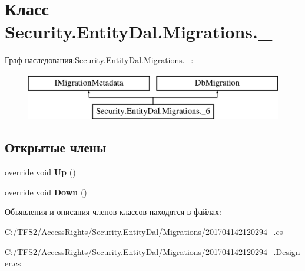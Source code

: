 \hypertarget{class_security_1_1_entity_dal_1_1_migrations_1_1__6}{}\section{Класс Security.\+Entity\+Dal.\+Migrations.\+\_}
\label{class_security_1_1_entity_dal_1_1_migrations_1_1__6}
Граф наследования\+:Security.\+Entity\+Dal.\+Migrations.\+\_\+:\begin{figure}[H]
\begin{center}
\leavevmode
\includegraphics[height=2.000000cm]{d0/d06/class_security_1_1_entity_dal_1_1_migrations_1_1__6}
\end{center}
\end{figure}
\subsection*{Открытые члены}
\begin{DoxyCompactItemize}
\item 
\mbox{\label{class_security_1_1_entity_dal_1_1_migrations_1_1__6_a51a2900e9ab59eee81830477fda90f90}} 
override void {\bfseries Up} ()
\item 
\mbox{\label{class_security_1_1_entity_dal_1_1_migrations_1_1__6_a2881353eafa9f28a52a3866fda3612fb}} 
override void {\bfseries Down} ()
\end{DoxyCompactItemize}


Объявления и описания членов классов находятся в файлах\+:\begin{DoxyCompactItemize}
\item 
C\+:/\+T\+F\+S2/\+Access\+Rights/\+Security.\+Entity\+Dal/\+Migrations/201704142120294\+\_.\+cs\item 
C\+:/\+T\+F\+S2/\+Access\+Rights/\+Security.\+Entity\+Dal/\+Migrations/201704142120294\+\_.\+Designer.\+cs\end{DoxyCompactItemize}
